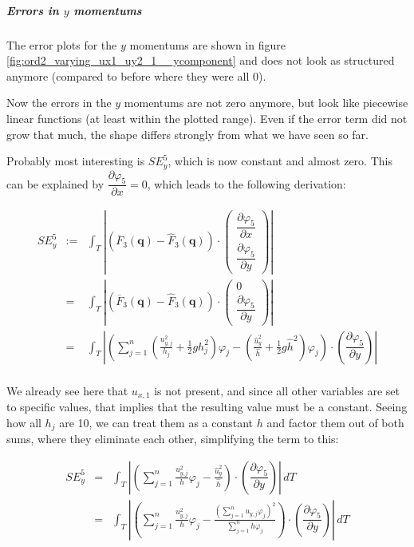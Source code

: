 \documentclass[a4paper, twoside]{article}
\newcommand{\pd}[2]{\dfrac{\partial #1}{\partial #2}}
\renewcommand{\phi}{\varphi}
\begin{document}
\subparagraph{\texorpdfstring{Errors in $y$ momentums}{Errors in y momentums}}

The error plots for the $y$ momentums are shown in figure \ref{fig:ord2_varying_ux1_uy2_1__ycomponent} and does not look as structured anymore (compared to before where they were all 0).



Now the errors in the $y$ momentums are not zero anymore, but look like piecewise linear functions (at least within the plotted range). Even if the error term did not grow that much, the shape differs strongly from what we have seen so far.

Probably most interesting is $SE_y^5$, which is now constant and almost zero. This can be explained by $\pd{\phi_5}{x}=0$, which leads to the following derivation:

\begin{eqnarray*}
  SE_y^5 & := & \int_T \left| \left(\overline{F}_3\left(\mathbf{q}\right) - \widehat{F}_3\left(\mathbf{q}\right)\right) \cdot \begin{pmatrix}\pd{\phi_5}{x} \\ \pd{\phi_5}{y}\end{pmatrix}\right| \\
  {} & = & \int_T \left| \left(\overline{F}_3\left(\mathbf{q}\right) - \widehat{F}_3\left(\mathbf{q}\right)\right) \cdot \begin{pmatrix}0 \\ \pd{\phi_5}{y}\end{pmatrix}\right| \\
  {} & = & \int_T \left| \left( \sum_{j=1}^n \left(\frac{u_{y,j}^2}{h_j} + \frac{1}{2} g h_j^2\right) \phi_j - \left( \frac{\widehat{u}_y^2}{\widehat{h}} + \frac{1}{2} g \widehat{h}^2 \right) \phi_j \right) \cdot \left(\pd{\phi_5}{y}\right) \right| \\
\end{eqnarray*}

We already see here that $u_{x,1}$ is not present, and since all other variables are set to specific values, that implies that the resulting value must be a constant. Seeing how all $h_j$ are 10, we can treat them as a constant $h$ and factor them out of both sums, where they eliminate each other, simplifying the term to this:

\begin{eqnarray*}
  SE_y^5 & = & \int_T \left| \left( \sum_{j=1}^n \frac{u_{y,j}^2}{h} \phi_j - \frac{\widehat{u}_y^2}{\widehat{h}} \right) \cdot \left(\pd{\phi_5}{y}\right) \right|\, dT \\
  {} & = & \int_T \left| \left( \sum_{j=1}^n \frac{u_{y,j}^2}{h} \phi_j - \frac{\left(\sum_{j=1}^n u_{y,j}\phi_j\right)^2}{\sum_{j=1}^n h\phi_j} \right) \cdot \left(\pd{\phi_5}{y}\right) \right|\, dT \\
\end{eqnarray*}
\end{document}
